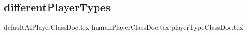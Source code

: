 \subsection{differentPlayerTypes}
\label{ss:differentPlayerTypes}

{defaultAIPlayerClassDoc.tex}
\newpage
{humanPlayerClassDoc.tex}
\newpage
{playerTypeClassDoc.tex}